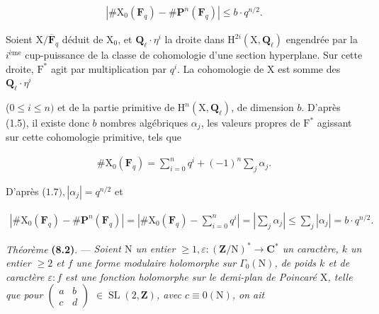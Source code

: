 \documentclass[10pt,leqno]{article}
\begin{document}
\begin{equation*}\begin{gathered}|\# \mathrm{X}_{0}(\mathbf{F}_{q})- \# \mathbf{P}^{n}(\mathbf{F}_{q})| \leq  b\cdot q^{n/2}.\end{gathered}\end{equation*}

\noindent Soient \(\mathrm{X}/\overline{\mathbf{F}}_{q}\) déduit de \(\mathrm{X}_{0}\), et \(\mathbf{Q}_{\ell }\cdot \eta ^{i}\) la droite dans \(\mathrm{H}^{2i}(\mathrm{X},\mathbf{Q}_{\ell })\) engendrée par la \(i^{\mathrm{ème}}\) cup-puissance de la classe de cohomologie d’une section hyperplane. Sur cette droite, \(\mathrm{F}^{*}\) agit par multiplication par \(q^{i}\). La cohomologie de \(\mathrm{X}\) est somme des \(\mathbf{Q}_{\ell }\cdot \eta ^{i}\)\par

\clearpage

\label{physical-31}

\noindent (\(0 \leq  i \leq  n)\) et de la partie primitive de \(\mathrm{H}^{n}(\mathrm{X}, \mathbf{Q}_{\ell })\), de dimension \(b\). D'après (1.5), il existe donc \(b\) nombres algébriques \(\alpha _{j}\), les valeurs propres de \(\mathrm{F}^{*}\) agissant sur cette cohomologie primitive, tels que\par

\begin{equation*}\begin{gathered}\# \mathrm{X}_{0}(\mathbf{F}_{q}) = \sum _{i=0}^{n} q^{i} + (-1)^{n} \sum _{j} \alpha _{j}.\end{gathered}\end{equation*}

\noindent D'après (\(1.7), |\alpha _{j}| = q^{n/2}\) et\par

\begin{equation*}\begin{gathered}|\# \mathrm{X}_{0}(\mathbf{F}_{q}) - \# \mathbf{P}^{n}(\mathbf{F}_{q})| = |\# \mathrm{X}_{0}(\mathbf{F}_{q}) - \sum _{i=0}^{n} q^{i}| = |\sum _{j} \alpha _{j}| \leq  \sum _{j} |\alpha _{j}| = b\cdot q^{n/2}.\end{gathered}\end{equation*}

\noindent \emph{Théorème} \textbf{(8.2)}. — {\itshape Soient \(\mathrm{N}\) un entier \(\geq  1, \varepsilon  : (\mathbf{Z}/\mathrm{N})^{*} \longrightarrow  \mathbf{C}^{*}\) un caractère, \(k\) un entier \(\geq  2\) et \(f\) une forme modulaire holomorphe sur \(\Gamma _{0}(\mathrm{N})\), de poids \(k\) et de caractère \(\varepsilon  : f\) est une fonction holomorphe sur le demi-plan de Poincaré \(\mathrm{X}\), telle que pour \(\begin{pmatrix}a&b\\c&d\end{pmatrix}\) \(\in  \operatorname{SL}(2, \mathbf{Z})\), avec \(c \equiv  0 (\mathrm{N})\), on ait}\par
\end{document}
